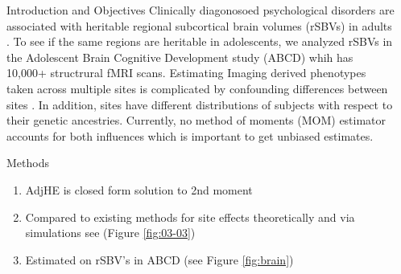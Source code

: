 \documentclass[final]{beamer}
\newlength{\sepwid}
\newlength{\onecolwid}
\begin{document}
\begin{frame}[t] %
\begin{columns}[t] %
\begin{column}{\sepwid}\end{column} %
\begin{column}{\onecolwid} %
\begin{block}{Introduction and Objectives}
Clinically diagonosoed psychological disorders are associated with heritable regional subcortical brain volumes (rSBVs) in adults \cite{koolschijn_brain_2009, zhao_heritability_2019}. To see if the same regions are heritable in adolescents, we analyzed rSBVs in the Adolescent Brain Cognitive Development study (ABCD) whih has 10,000+ structrural fMRI scans. Estimating Imaging derived phenotypes taken across multiple sites is complicated by confounding differences between sites \cite{bayer_site_2022}. In addition, sites have different distributions of subjects with respect to their genetic ancestries. Currently, no method of moments (MOM) estimator accounts for both influences which is important to get unbiased estimates.
\end{block}


\begin{block}{Methods}
\begin{enumerate}
    \item AdjHE is closed form solution to 2nd moment \cite{lin_estimating_2022}
    \item Compared to existing methods for site effects theoretically and via simulations see (Figure \ref{fig:03-03})
    \item Estimated on rSBV's in ABCD (see Figure \ref{fig:brain})
\end{enumerate}

\end{block}


\end{column}
\end{columns}
\end{frame}
\end{document}
